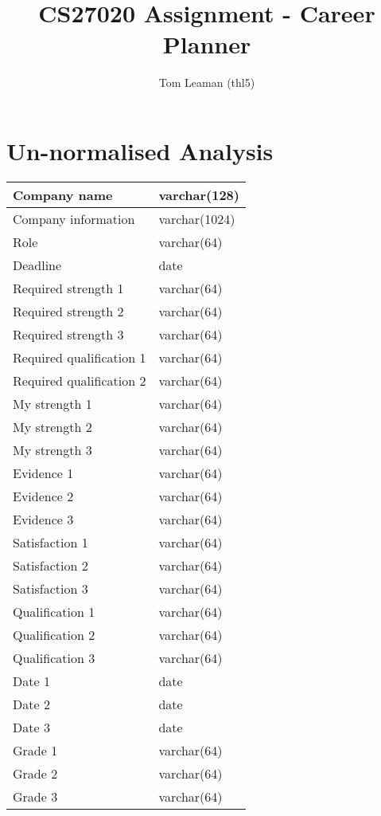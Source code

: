 \documentclass[a4paper, twoside]{article}
\title{CS27020 Assignment - Career Planner}
\author{Tom Leaman (thl5)}
\begin{document}
\maketitle
\newpage

\section{Un-normalised Analysis}
\begin{center}
\begin{tabular}{|l|l|}
\hline
Company name & varchar(128) \\ \hline
Company information & varchar(1024) \\ \hline
Role & varchar(64) \\ \hline
Deadline & date \\ \hline
Required strength 1 & varchar(64) \\ \hline
Required strength 2 & varchar(64) \\ \hline
Required strength 3 & varchar(64) \\ \hline
Required qualification 1 & varchar(64) \\ \hline
Required qualification 2 & varchar(64) \\ \hline
My strength 1 & varchar(64) \\ \hline
My strength 2 & varchar(64) \\ \hline
My strength 3 & varchar(64) \\ \hline
Evidence 1 & varchar(64) \\ \hline
Evidence 2 & varchar(64) \\ \hline
Evidence 3 & varchar(64) \\ \hline
Satisfaction 1 & varchar(64) \\ \hline
Satisfaction 2 & varchar(64) \\ \hline
Satisfaction 3 & varchar(64) \\ \hline
Qualification 1 & varchar(64) \\ \hline
Qualification 2 & varchar(64) \\ \hline
Qualification 3 & varchar(64) \\ \hline
Date 1 & date \\ \hline
Date 2 & date \\ \hline
Date 3 & date \\ \hline
Grade 1 & varchar(64) \\ \hline
Grade 2 & varchar(64) \\ \hline
Grade 3 & varchar(64) \\ \hline

\end{tabular}
\end{center}
\end{document}
